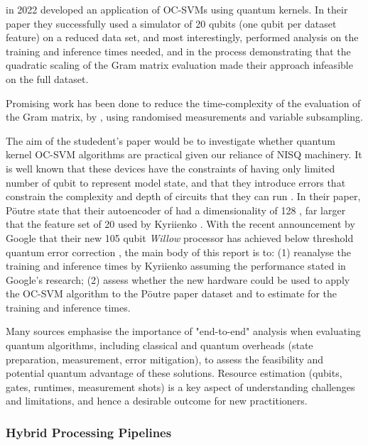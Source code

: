 \citeauthor{Kyriienko:2022} \cite{Kyriienko:2022} in 2022 developed an application of OC-SVMs using quantum kernels.
In their paper they successfully used a simulator of 20 qubits (one qubit per dataset feature)
on a reduced data set, and most interestingly, performed analysis on the training and inference times needed, 
and in the process demonstrating that the quadratic scaling of the Gram matrix evaluation 
made their approach infeasible on the full dataset.

Promising work has been done to reduce the time-complexity of the evaluation of the Gram matrix, 
by \citeauthor{Kolle:2023} \cite{Kolle:2023}, using randomised measurements and variable subsampling.

The aim of the studedent's paper would be to investigate whether quantum kernel OC-SVM algorithms are practical 
given our reliance of NISQ machinery.
It is well known that these devices have the constraints of having only limited number of qubit to represent model state,
and that they introduce errors that constrain the complexity and depth of circuits that they can run \cite{Preskill:2018}.
In their paper, P\"{o}utre state that their autoencoder of had a dimensionality of 128 \cite{Poutre:2024},
far larger that the feature set of 20 used by Kyriienko \cite{Kyriienko:2022}.
With the recent announcement by Google that their new 105 qubit \emph{Willow} processor has
achieved below threshold quantum error correction \cite{Google:Willow:2024}, the main body of this report is to: 
(1) reanalyse the training and inference times by Kyriienko assuming the performance stated in Google's research;
(2) assess whether the new hardware could be used to apply the OC-SVM algorithm to the P\"{o}utre paper dataset
and to estimate for the training and inference times.


Many sources emphasise the importance of "end-to-end" analysis when evaluating quantum \cite{Dalzell:2023} \cite{Morales:2025}
algorithms, including classical and quantum overheads (state preparation, measurement, error mitigation),
to assess the feasibility and potential quantum advantage of these solutions.  
Resource estimation (qubits, gates, runtimes, measurement shots) 
is a key aspect of understanding challenges and limitations,
and hence a desirable outcome for new practitioners.

\subsubsection{Hybrid Processing Pipelines}

